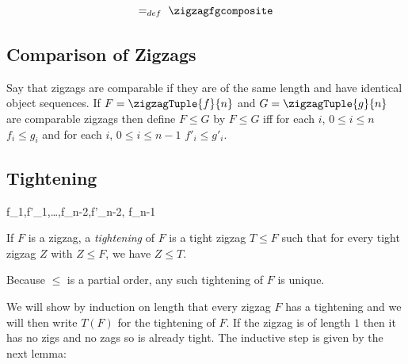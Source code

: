 $$
=_{def} \  \zigzagfgcomposite
$$

\subsection{Comparison of Zigzags}

Say that zigzags are comparable if they are of the same length
and have identical object sequences.
If $F=\zigzagTuple{f}{n}$ and 
$G=\zigzagTuple{g}{n}$
 are comparable zigzags then define $F \leq G$
by $F \leq G$ iff for each $i$, $0 \leq i \leq n$
$f_i \leq g_i$ and for each $i$, $0 \leq i \leq n-1$ $f'_i \leq g'_i$.

\subsection{Tightening}

{%
  f_1,f'_1,\ldots,f_{n-2},f'_{n-2},
  f_{n-1}\circ
}

{%
}

If $F$ is a zigzag, a \textit{tightening} of $F$ is a tight zigzag
$T \leq F$ such that for every tight zigzag $Z$ with $Z \leq F$,
we have $Z \leq T$.

Because $\leq$ is a partial order, any such tightening of $F$ is unique.

We will show by induction on length that every zigzag $F$ has a tightening and we will then write $T(F)$ for the tightening of $F$.
If the zigzag is of length $1$ then it has no zigs and no zags so is already tight. The inductive step is given by the next lemma: 

